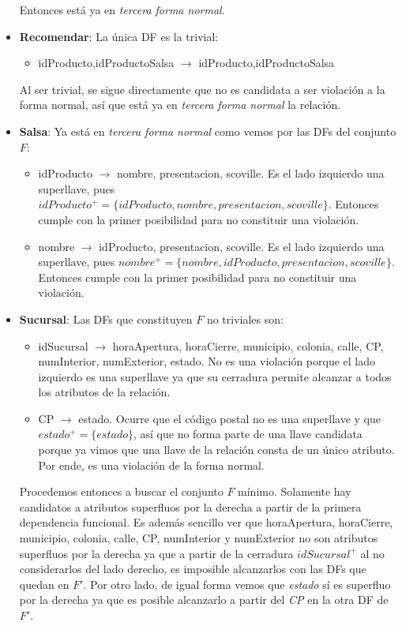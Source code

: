 \documentclass[11pt,letterpaper]{article}
\begin{document}
\begin{itemize}
Entonces está ya en \textit{tercera forma normal}.


\item \textbf{Recomendar}: La única DF es la trivial:

\begin{itemize}
\item idProducto,idProductoSalsa $\rightarrow$ idProducto,idProductoSalsa
\end{itemize}

Al ser trivial, se sigue directamente que no es candidata a ser violación a la forma normal, así que está ya en \textit{tercera forma normal} la relación. 

\item \textbf{Salsa}: Ya está en \textit{tercera forma normal} como vemos por las DFs del conjunto $F$:

\begin{itemize}


\item idProducto $\rightarrow$ nombre, presentacion, scoville. Es el lado izquierdo una superllave, pues $idProducto^+=\{idProducto,nombre, presentacion, scoville\}$. Entonces cumple con la primer posibilidad para no constituir una violación.
\item  nombre $\rightarrow$ idProducto, presentacion, scoville. Es el lado izquierdo una superllave, pues $nombre^+=\{nombre,idProducto, presentacion, scoville\}$. Entonces cumple con la primer posibilidad para no constituir una violación.

\end{itemize}
\item \textbf{Sucursal}: Las DFs que constituyen $F$ no triviales son:

\begin{itemize}
\item idSucursal $\rightarrow$ horaApertura, horaCierre, municipio, colonia, calle, CP, numInterior, numExterior, estado. No es una violación porque el lado izquierdo es una superllave ya que su cerradura permite alcanzar a todos los atributos de la relación.
\item CP $\rightarrow$ estado. Ocurre que el código postal no es una superllave y que $estado^+=\{estado\}$, así que no forma parte de una llave candidata porque ya vimos que una llave de la relación consta de un único atributo. Por ende, es una violación de la forma normal.
\end{itemize} 

Procedemos entonces a buscar el conjunto $F$ mínimo. Solamente hay candidatos a atributos superfluos por la derecha a partir de la primera dependencia funcional. Es además sencillo ver que horaApertura, horaCierre, municipio, colonia, calle, CP, numInterior y numExterior no son atributos superfluos por la derecha ya que a partir de la cerradura $idSucursal^+$ al no considerarlos del lado derecho, es imposible alcanzarlos con las DFs que quedan en $F'$. Por otro lado, de igual forma vemos que \textit{estado} sí es superfluo por la derecha ya que es posible alcanzarlo a partir del \textit{CP} en la otra DF de $F'$.\\


\end{itemize}
\end{document}

